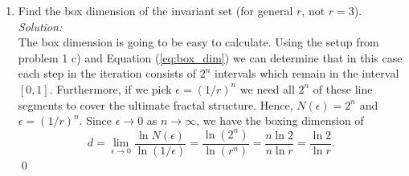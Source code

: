 \documentclass[10pt]{amsart}
\theoremstyle{nonumberplain}
\begin{document}
\begin{enumerate}[label={\bf {\arabic*}:}]
\begin{enumerate}
\item Find the box dimension of the invariant set (for general $r$, not $r = 3$). \\

\textit{Solution:} \\
The box dimension is going to be easy to calculate.
Using the setup from problem 1 c) and Equation (\eqref{eq:box_dim}) we can determine that in this case each step in the iteration consists of $2^n$ intervals which remain in the interval $[0, 1]$. 
Furthermore, if we pick $\epsilon = (1/r)^n$ we need all $2^n$ of these line segments to cover the ultimate fractal structure. 
Hence, $N(\epsilon) = 2^n$ and $\epsilon = (1/r)^n$.
Since $\epsilon \rightarrow 0$ as $n \rightarrow \infty$, we have the boxing dimension of
$$
d = \lim_{\epsilon \rightarrow 0} \frac {\ln N(\epsilon)}{\ln (1/\epsilon)}
	= \frac {\ln (2^n)}{\ln (r^n)}
	= \frac {n \ln 2}{n \ln r}
	= \frac {\ln 2 }{\ln r}.
$$
\qed \\

\end{enumerate}

\end{enumerate}
\end{document}
